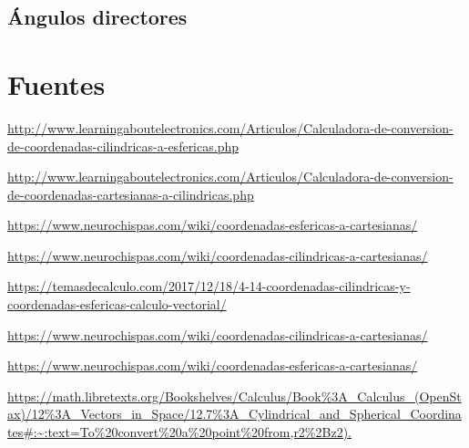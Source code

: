 \documentclass{article}
\begin{document}
\subsection{Ángulos directores}
\label{sec:org19bfa16}

\section{Fuentes}
\label{sec:org2bd2a68}

\url{http://www.learningaboutelectronics.com/Articulos/Calculadora-de-conversion-de-coordenadas-cilindricas-a-esfericas.php}

\url{http://www.learningaboutelectronics.com/Articulos/Calculadora-de-conversion-de-coordenadas-cartesianas-a-cilindricas.php}

\url{https://www.neurochispas.com/wiki/coordenadas-esfericas-a-cartesianas/}

\url{https://www.neurochispas.com/wiki/coordenadas-cilindricas-a-cartesianas/}

\url{https://temasdecalculo.com/2017/12/18/4-14-coordenadas-cilindricas-y-coordenadas-esfericas-calculo-vectorial/}

\url{https://www.neurochispas.com/wiki/coordenadas-cilindricas-a-cartesianas/}

\url{https://www.neurochispas.com/wiki/coordenadas-esfericas-a-cartesianas/}

\url{https://math.libretexts.org/Bookshelves/Calculus/Book\%3A\_Calculus\_(OpenStax)/12\%3A\_Vectors\_in\_Space/12.7\%3A\_Cylindrical\_and\_Spherical\_Coordinates\#:\~:text=To\%20convert\%20a\%20point\%20from,r2\%2Bz2).}
\end{document}
